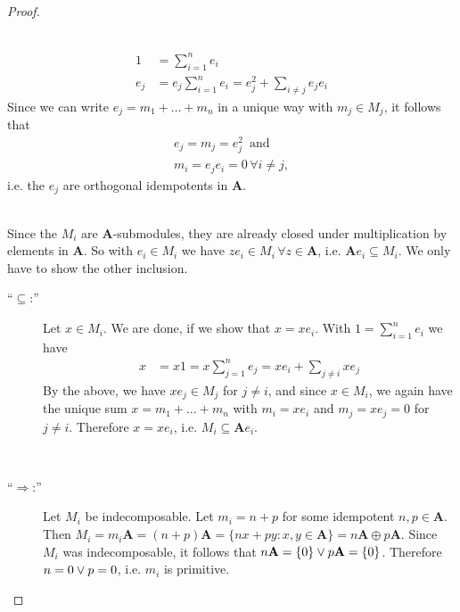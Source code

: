 \begin{proof}[Proof\nopunct]
\begin{subproof}
\phantom{}\\
\begin{align}
1 &= \sum_{i=1}^{n} e_{i}\\
e_{j} &= e_{j}\sum_{i=1}^{n} e_{i} = e_{j}^{2} + \sum_{i\neq j} e_{j} e_{i}
\end{align}
Since we can write $e_{j} = m_{1} + \dots + m_{n}$ in a unique way with $m_{j} \in M_{j}$, it follows that
\begin{align}
e_{j} = m_{j} = e_{j}^{2}\, \text{ and }\\
m_{i} = e_{j} e_{i} = 0\,\forall i \neq j,
\end{align}
i.e. the $e_{j}$ are orthogonal idempotents in $\mathbf{A}$.
\end{subproof}
\begin{subproof}[Proof that $M_{i} = \mathbf{A}e_{i}$]\phantom{}\\
Since the $M_{i}$ are $\mathbf{A}$-submodules, they are already closed under multiplication by elements in $\mathbf{A}$.
So with $e_{i} \in M_{i}$ we have $ze_{i} \in M_{i}\, \forall z \in \mathbf{A}$, i.e. $\mathbf{A}e_{i} \subseteq M_{i}$.
We only have to show the other inclusion.
\begin{description}
\item[``$\subseteq$:''] Let $x \in M_{i}$. We are done, if we show that $x = xe_{i}$. With $1 = \sum_{i=1}^{n} e_{i}$ we have
\begin{align}
x &= x1 = x\sum_{j=1}^{n} e_{j} = xe_{i} + \sum_{j\neq i} xe_{j}
\end{align}
By the above, we have $xe_{j} \in M_{j}$ for $j\neq i$, and since $x \in M_{i}$, we again have the unique sum $x = m_{1} + \dots + m_{n}$
with $m_{i} = xe_{i}$ and $m_{j} = xe_{j} = 0$ for $j \neq i$. Therefore $x = xe_{i}$, i.e. $M_{i} \subseteq \mathbf{A}e_{i}$.
\end{description}
\end{subproof}
\begin{subproof}\phantom{}\\
\begin{description}
\item[``$\Rightarrow$:''] Let $M_{i}$ be indecomposable. Let $m_{i} = n + p$ for some idempotent $n, p \in \mathbf{A}$. Then
$M_{i} = m_{i}\mathbf{A} = (n+p)\mathbf{A} = \{nx + py : x,y \in \mathbf{A}\} = n\mathbf{A} \oplus p\mathbf{A}$. Since $M_{i}$ was
indecomposable, it follows that $n\mathbf{A} = \{0\} \vee p\mathbf{A} = \{0\}$. Therefore $n = 0 \vee p = 0$, i.e. $m_{i}$ is primitive.


\end{description}
\end{subproof}
\end{proof}
